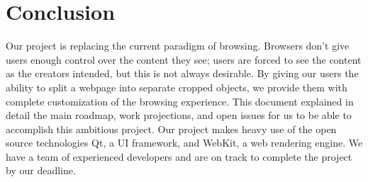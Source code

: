 \documentclass[12pt]{article}
\begin{document}
\section{Conclusion} %
\label{sec:conclusion}
Our project is replacing the current paradigm of browsing. Browsers don't give users enough control over the content they see; users are forced to see the content as the creators intended, but this is not always desirable. By giving our users the ability to split a webpage into separate cropped objects, we provide them with complete customization of the browsing experience. This document explained in detail the main roadmap, work projections, and open issues for us to be able to accomplish this ambitious project. Our project makes heavy use of the open source technologies Qt, a UI framework, and WebKit, a web rendering engine. We have a team of experienced developers and are on track to complete the project by our deadline.
\end{document}

